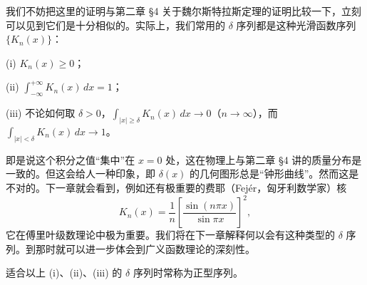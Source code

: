 我们不妨把这里的证明与第二章 §4 关于魏尔斯特拉斯定理的证明比较一下，立刻可以见到它们是十分相似的。实际上，我们常用的 $\delta$ 序列都是这种光滑函数序列 $\{K_n(x)\}$：

(i) $K_n(x)\ge0$；

(ii) $\displaystyle\int_{-\infty}^{+\infty}K_n(x)\,dx=1$；

(iii) 不论如何取 $\delta>0$，$\displaystyle\int_{|x|\ge\delta}K_n(x)\,dx\to0$（$n\to\infty$），而 $\displaystyle\int_{|x|<\delta}K_n(x)\,dx\to1$。

即是说这个积分之值“集中”在 $x=0$ 处，这在物理上与第二章 §4 讲的质量分布是一致的。但这会给人一种印象，即 $\delta(x)$ 的几何图形总是“钟形曲线”。然而这是不对的。下一章就会看到，例如还有极重要的费耶（Fejér，匈牙利数学家）核
\[
 K_n(x)=\frac1n\left[\frac{\sin(n\pi x)}{\sin\pi x}\right]^2,
\]
它在傅里叶级数理论中极为重要。我们将在下一章解释何以会有这种类型的 $\delta$ 序列。到那时就可以进一步体会到广义函数理论的深刻性。

适合以上 (i)、(ii)、(iii) 的 $\delta$ 序列时常称为正型序列。
